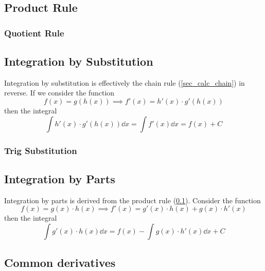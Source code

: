 \documentclass[fleqn,a4paper,11pt]{article}
\begin{document}
    \subsection{Product Rule} \label{sec_calc_product}

    \subsubsection{Quotient Rule} \label{sec_calc_quotient}

    \subsection{Integration by Substitution} \label{sec_calc_substitution}

    Integration by substitution is effectively the chain rule
    (\ref{sec_calc_chain}) in reverse. If we consider the function
    \begin{equation*}
    f(x) = g(h(x)) \implies f'(x) = h'(x) \cdot g'(h(x))
    \end{equation*}
    then the integral
    \begin{equation}
    \int h'(x) \cdot g'(h(x)) \dd{x} = \int f'(x) \dd{x} = f(x) + C
    \end{equation}

    \subsubsection{Trig Substitution} \label{sec_calc_trig_substitution}

    \subsection{Integration by Parts}

    Integration by parts is derived from the product rule
    (\ref{sec_calc_product}).  Consider the function
    \begin{equation*}
    f(x) = g(x) \cdot h(x) \implies f'(x) = g'(x) \cdot h(x) + g(x) \cdot h'(x)
    \end{equation*}
    then the integral
    \begin{equation}
    \int g'(x) \cdot h(x) \dd{x} = f(x) - \int g(x) \cdot h'(x) \dd{x} + C
    \end{equation}

    \subsection{Common derivatives} \label{calc_common}
\end{document}
